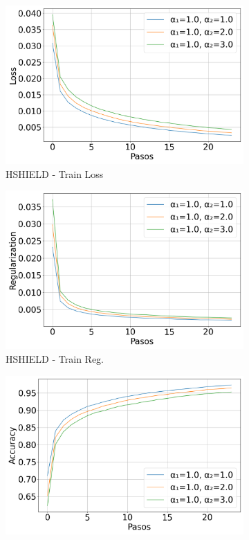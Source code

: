 \begin{figure}[H]
    \centering
    \begin{subfigure}[b]{0.3\textwidth}
        \includegraphics[width=\linewidth]{images/Train_Loss_evolucion_hshield.png}
        \caption{HSHIELD - Train Loss}
    \end{subfigure}
    \hfill
    \begin{subfigure}[b]{0.3\textwidth}
        \includegraphics[width=\linewidth]{images/Train_Regularization_evolucion_hshield.png}
        \caption{HSHIELD - Train Reg.}
    \end{subfigure}
    \hfill
    \begin{subfigure}[b]{0.3\textwidth}
        \includegraphics[width=\linewidth]{images/Train_Accuracy_evolucion_hshield.png}

\end{subfigure}
\end{figure}
